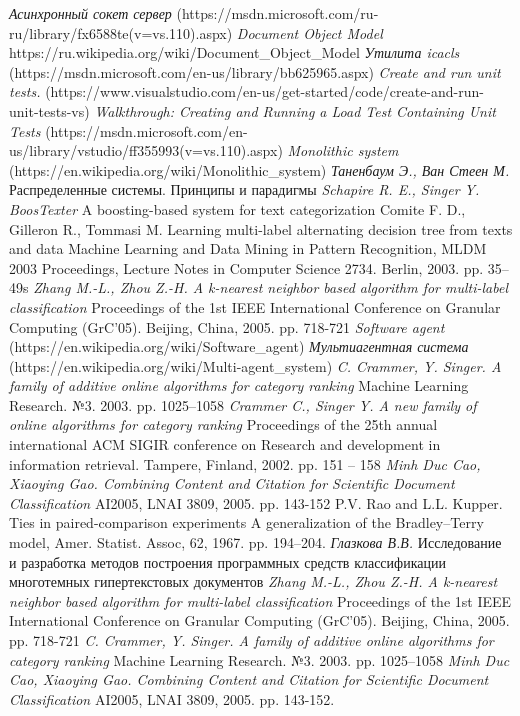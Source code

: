\documentclass[russian, utf8, emptystyle]{eskdtext}
\begin{document}
\begin{thebibliography}{50}
	\textit{Асинхронный сокет сервер}
	{(https://msdn.microsoft.com/ru-ru/library/fx6588te(v=vs.110).aspx)}
	\textit{Document Object Model}
	{https://ru.wikipedia.org/wiki/Document\_Object\_Model}
	\textit{Утилита icacls}
	{(https://msdn.microsoft.com/en-us/library/bb625965.aspx)}
	\textit{Create and run unit tests.}
	{(https://www.visualstudio.com/en-us/get-started/code/create-and-run-unit-tests-vs)}
	\textit{Walkthrough: Creating and Running a Load Test Containing Unit Tests}
	{(https://msdn.microsoft.com/en-us/library/vstudio/ff355993(v=vs.110).aspx)}
	\textit{Monolithic system}
	{(https://en.wikipedia.org/wiki/Monolithic\_system)}
	\textit{Таненбаум Э., Ван Стеен М.}
	{Распределенные системы. Принципы и парадигмы}
	\textit{Schapire R. E., Singer Y. BoosTexter}
	{A boosting-based system for text categorization}
	{Comite F. D., Gilleron R., Tommasi M. Learning multi-label alternating decision tree from texts and data}
	{Machine Learning and Data Mining in Pattern Recognition, MLDM 2003 Proceedings, Lecture Notes in Computer Science 2734. Berlin, 2003. pp. 35–49s}
	\textit{Zhang M.-L., Zhou Z.-H. A k-nearest neighbor based algorithm for multi-label classification }
	{Proceedings of the 1st IEEE International Conference on Granular Computing (GrC'05). Beijing, China, 2005. pp. 718-721}
	\textit{Software agent}
	{(https://en.wikipedia.org/wiki/Software\_agent)}
	\textit{Мультиагентная система}
	{(https://en.wikipedia.org/wiki/Multi-agent\_system)}
	\textit{C. Crammer, Y. Singer. A family of additive online algorithms for category ranking}
	{Machine Learning Research. №3. 2003. pp. 1025–1058}
	\textit{Crammer C., Singer Y. A new family of online algorithms for category ranking }
	{Proceedings of the 25th annual international ACM SIGIR conference on Research and development in information retrieval. Tampere, Finland, 2002. pp. 151 – 158}
	\textit{Minh Duc Cao, Xiaoying Gao. Combining Content and Citation for Scientific Document Classification}
	{AI2005, LNAI 3809, 2005. pp. 143-152}
	{P.V. Rao and L.L. Kupper. Ties in paired-comparison experiments}
	{A generalization of the Bradley–Terry model, Amer. Statist. Assoc, 62, 1967. pp. 194–204.}
	\textit{Глазкова В.В.}
	{Исследование и разработка методов построения программных средств классификации многотемных гипертекстовых документов}
	\textit{Zhang M.-L., Zhou Z.-H. A k-nearest neighbor based algorithm for multi-label classification }
	{Proceedings of the 1st IEEE International Conference on Granular Computing (GrC'05). Beijing, China, 2005. pp. 718-721}
	\textit{C. Crammer, Y. Singer. A family of additive online algorithms for category ranking}
	{Machine Learning Research. №3. 2003. pp. 1025–1058}
	\textit{Minh Duc Cao, Xiaoying Gao. Combining Content and Citation for Scientific Document Classification}
	{AI2005, LNAI 3809, 2005. pp. 143-152.}
\end{thebibliography}
\end{document}

